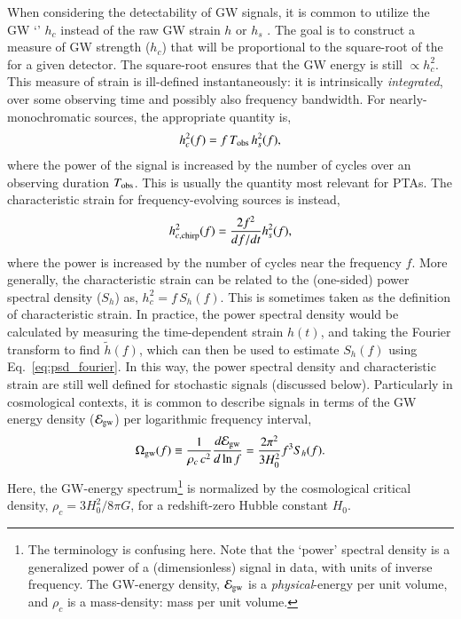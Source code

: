 \documentclass[onecolumn,authoryear]{els-mrw}
\begin{document}
When considering the detectability of GW signals, it is common to utilize the GW `' $h_c$ instead of the raw GW strain $h$ or $h_s$ \citep[for thorough discussions, see:][]{Flanagan+Hughes-1998, Moore+2015}.  The goal is to construct a measure of GW strength ($h_c$) that will be proportional to the square-root of the  for a given detector.  The square-root ensures that the GW energy is still $\propto h_c^2$.  This measure of strain is ill-defined instantaneously: it is intrinsically \textit{integrated}, over some observing time and possibly also frequency bandwidth.  For nearly-monochromatic sources, the appropriate quantity is,
\begin{align}\label{eq:characterist_strain_mono}
    h_c^2(f) = f \, T_{\textrm{obs}} \, h_s^2(f),
\end{align}
where the power of the signal is increased by the number of cycles over an observing duration $T_{\textrm{obs}}$.  This is usually the quantity most relevant for PTAs.  The characteristic strain for frequency-evolving sources is instead,
\begin{align}\label{eq:characterist_strain_chirp}
    h_{c,\textrm{chirp}}^2(f) = \frac{2 f^2}{df/dt} h_s^2(f),
\end{align}
where the power is increased by the number of cycles near the frequency $f$.  More generally, the characteristic strain can be related to the (one-sided) power spectral density ($S_h$) as, $h_c^2 = f \, S_h(f)$.  This is sometimes taken as the definition of characteristic strain.  In practice, the power spectral density would be calculated by measuring the time-dependent strain $h(t)$, and taking the Fourier transform to find $\tilde{h}(f)$, which can then be used to estimate $S_h(f)$ using Eq.~\ref{eq:psd_fourier}.  In this way, the power spectral density and characteristic strain are still well defined for stochastic signals (discussed below).  Particularly in cosmological contexts, it is common to describe signals in terms of the GW energy density ($\mathcal{E}_{\textrm{gw}}$) per logarithmic frequency interval,
\begin{align}
    \Omega_{\textrm{gw}}(f) \equiv \frac{1}{\rho_c \, c^2} \frac{d \mathcal{E}_{\textrm{gw}}}{d \ln f} = \frac{2 \pi^2}{3 H_0^2} f^3 S_h(f).
\end{align}
Here, the GW-energy spectrum\footnote{The terminology is confusing here.  Note that the `power' spectral density is a generalized power of a (dimensionless) signal in data, with units of inverse frequency.  The GW-energy density, $\mathcal{E}_{\textrm{gw}}$ is a \textit{physical}-energy per unit volume, and $\rho_c$ is a mass-density: mass per unit volume.} is normalized by the cosmological critical density, $\rho_c = 3 H_0^2 / 8 \pi G$, for a redshift-zero Hubble constant $H_0$.
\end{document}
